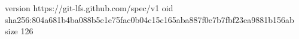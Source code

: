 version https://git-lfs.github.com/spec/v1
oid sha256:804a681b4ba088b5e1e75fac0b04c15c165aba887f0e7b7fbf23ea9881b156ab
size 126
